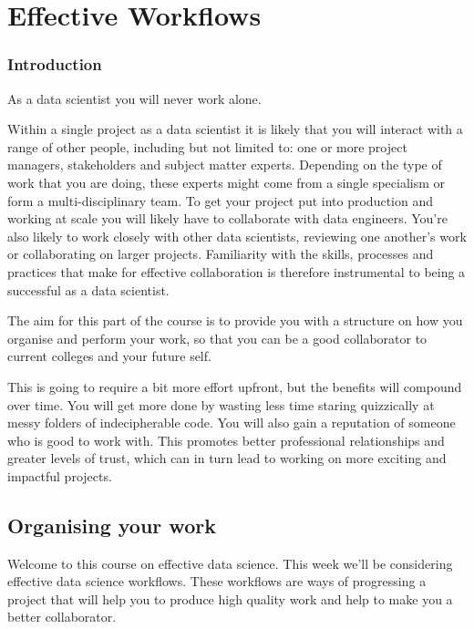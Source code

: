 \documentclass[
  letterpaper,
  DIV=11,
  numbers=noendperiod]{scrreprt}
\begin{document}
\part{Effective Workflows}

\section*{Introduction}\label{introduction}


As a data scientist you will never work alone.

Within a single project as a data scientist it is likely that you will
interact with a range of other people, including but not limited to: one
or more project managers, stakeholders and subject matter experts.
Depending on the type of work that you are doing, these experts might
come from a single specialism or form a multi-disciplinary team. To get
your project put into production and working at scale you will likely
have to collaborate with data engineers. You're also likely to work
closely with other data scientists, reviewing one another's work or
collaborating on larger projects. Familiarity with the skills, processes
and practices that make for effective collaboration is therefore
instrumental to being a successful as a data scientist.

The aim for this part of the course is to provide you with a structure
on how you organise and perform your work, so that you can be a good
collaborator to current colleges and your future self.

This is going to require a bit more effort upfront, but the benefits
will compound over time. You will get more done by wasting less time
staring quizzically at messy folders of indecipherable code. You will
also gain a reputation of someone who is good to work with. This
promotes better professional relationships and greater levels of trust,
which can in turn lead to working on more exciting and impactful
projects.

\chapter{Organising your work}\label{workflows-organising-your-work}

Welcome to this course on effective data science. This week we'll be
considering effective data science workflows. These workflows are ways
of progressing a project that will help you to produce high quality work
and help to make you a better collaborator.
\end{document}
